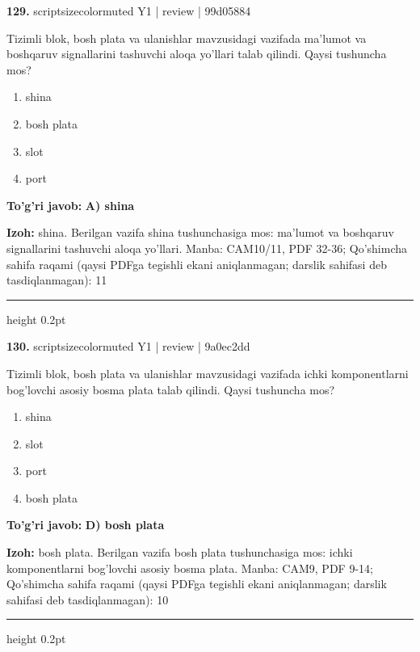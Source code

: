 \documentclass[10pt,a4paper]{article}
\begin{document}
{\bfseries\sffamily\color{ink} 129.} {scriptsizecolor{muted} Y1 | review | 99d05884}
\par
Tizimli blok, bosh plata va ulanishlar mavzusidagi vazifada ma'lumot va boshqaruv signallarini tashuvchi aloqa yo'llari talab qilindi. Qaysi tushuncha mos?
\begin{enumerate}[label=\Alph*),leftmargin=9mm]
\item shina
\item bosh plata
\item slot
\item port
\end{enumerate}
\begin{tcolorbox}[enhanced,breakable,colback=teal!4,colframe=teal!60!black,boxrule=0.45pt,arc=1.2mm,left=2.7mm,right=2.7mm,top=1.8mm,bottom=1.8mm,before skip=2mm,after skip=2mm]
{\bfseries\sffamily\color{teal}To'g'ri javob:} \textbf{A) shina}
\par\smallskip
{\bfseries Izoh:} shina. Berilgan vazifa shina tushunchasiga mos: ma'lumot va boshqaruv signallarini tashuvchi aloqa yo'llari. Manba: CAM10/11, PDF 32-36; Qo'shimcha sahifa raqami (qaysi PDFga tegishli ekani aniqlanmagan; darslik sahifasi deb tasdiqlanmagan): 11
\end{tcolorbox}
\vspace{2mm}\hrule height 0.2pt\vspace{3mm}

{\bfseries\sffamily\color{ink} 130.} {scriptsizecolor{muted} Y1 | review | 9a0ec2dd}
\par
Tizimli blok, bosh plata va ulanishlar mavzusidagi vazifada ichki komponentlarni bog'lovchi asosiy bosma plata talab qilindi. Qaysi tushuncha mos?
\begin{enumerate}[label=\Alph*),leftmargin=9mm]
\item shina
\item slot
\item port
\item bosh plata
\end{enumerate}
\begin{tcolorbox}[enhanced,breakable,colback=teal!4,colframe=teal!60!black,boxrule=0.45pt,arc=1.2mm,left=2.7mm,right=2.7mm,top=1.8mm,bottom=1.8mm,before skip=2mm,after skip=2mm]
{\bfseries\sffamily\color{teal}To'g'ri javob:} \textbf{D) bosh plata}
\par\smallskip
{\bfseries Izoh:} bosh plata. Berilgan vazifa bosh plata tushunchasiga mos: ichki komponentlarni bog'lovchi asosiy bosma plata. Manba: CAM9, PDF 9-14; Qo'shimcha sahifa raqami (qaysi PDFga tegishli ekani aniqlanmagan; darslik sahifasi deb tasdiqlanmagan): 10
\end{tcolorbox}
\vspace{2mm}\hrule height 0.2pt\vspace{3mm}
\end{document}
